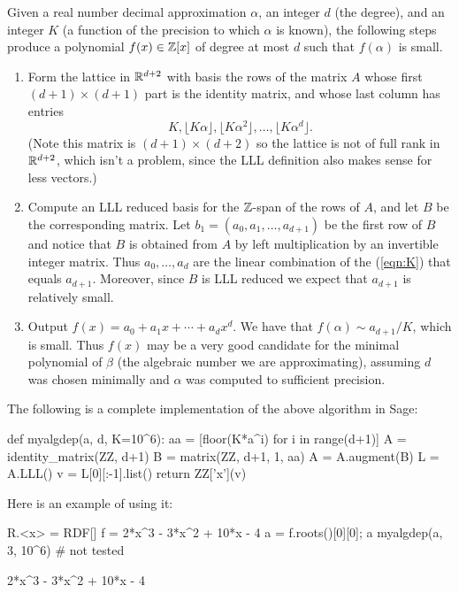 Given a real number decimal approximation $\alpha$, an
integer $d$ (the degree), and an integer $K$ (a function
of the precision to which $\alpha$ is known), the following
steps produce a polynomial $f(x) \in \mathbb{Z}[x]$ of degree 
at most $d$ such that $f(\alpha)$ is small.  
\begin{enumerate}
\item Form the lattice in $\mathbb{R}^{d+2}$ with basis the rows
of the matrix $A$ whose first $(d+1) \times (d+1)$ part is the
identity matrix, and whose last column has entries
\begin{equation}\label{eqn:K}
K, \lfloor K\alpha \rfloor, \lfloor K\alpha^2 \rfloor, 
\ldots, \lfloor K\alpha^{d} \rfloor.
\end{equation}
(Note this matrix is $(d+1) \times (d+2)$ so the lattice
is not of full rank in $\mathbb{R}^{d+2}$, which isn't a problem,
since the LLL definition also makes sense for less vectors.)
\item Compute an LLL reduced basis for the $\mathbb{Z}$-span of the rows
of $A$, and let $B$ be the corresponding matrix. 
Let $b_1 = (a_0, a_1, \ldots, a_{d+1})$ be the first
row of $B$ and notice that $B$ is obtained from $A$
by left multiplication by an invertible integer matrix.
Thus $a_0,\ldots, a_d$ are the linear combination of the
(\ref{eqn:K}) that equals $a_{d+1}$. Moreover, since $B$
is LLL reduced we expect that $a_{d+1}$ is relatively small. 

\item Output $f(x) = a_0 + a_1 x + \cdots + a_{d} x^d$.
We have that $f(\alpha) \sim a_{d+1}/K$, which is small.
Thus $f(x)$ may be a very good candidate for the minimal
polynomial of $\beta$ (the algebraic number we are approximating),
assuming $d$ was chosen minimally and $\alpha$ was computed
to sufficient precision.
\end{enumerate}

The following is a complete implementation of the above algorithm
in Sage:
\begin{sagecode}
\begin{sagecell}
def myalgdep(a, d, K=10^6):
    aa = [floor(K*a^i) for i in range(d+1)]
    A = identity_matrix(ZZ, d+1)
    B = matrix(ZZ, d+1, 1, aa)
    A = A.augment(B)
    L = A.LLL()
    v = L[0][:-1].list()
    return ZZ['x'](v)
\end{sagecell}
\end{sagecode}

Here is an example of using it:
\begin{sagecode}
\begin{sagecell}
R.<x> = RDF[]
f = 2*x^3 - 3*x^2 + 10*x - 4
a = f.roots()[0][0]; a
myalgdep(a, 3, 10^6)       # not tested
\end{sagecell}
\begin{sageout}
2*x^3 - 3*x^2 + 10*x - 4
\end{sageout}
\end{sagecode}


